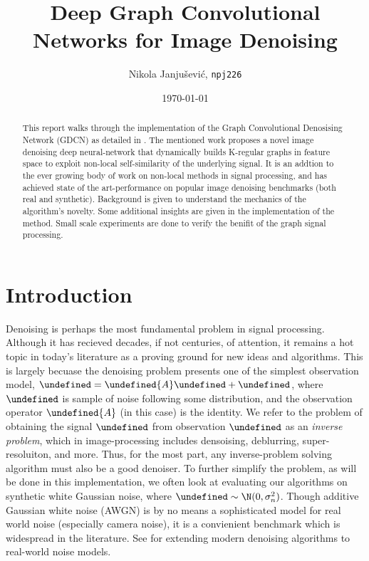 \documentclass[12pt,a4paper,reqno]{amsart}
\title{Deep Graph Convolutional Networks for Image Denoising}
\author{Nikola Janju\v{s}evi\'{c}, \texttt{npj226}}
\date{\today}
\let\bm\undefined
\newcommand{\bm}[1]{\mathbf{#1}}
\let\x\undefined
\newcommand{\x}{\bm{x}}
\let\y\undefined
\newcommand{\y}{\bm{y}}
\let\n\undefined
\newcommand{\n}{\bm{n}}
\begin{document}
\begin{abstract}
This report walks through the implementation of the Graph Convolutional
Denosising Network (GDCN) as detailed in \cite{ValsesiaICIP19}. The mentioned
work proposes a novel image denoising deep neural-network that dynamically
builds K-regular graphs in feature space to exploit non-local self-similarity of
the underlying signal. It is an addtion to the ever growing body of work on
non-local methods in signal processing, and has achieved state of the
art-performance on popular image denoising benchmarks (both real and synthetic). 
Background is given to understand the mechanics of the algorithm's novelty.
Some additional insights are given in the implementation of the method.
Small scale experiments are done to verify the benifit of the graph signal
processing. 
\end{abstract}

\maketitle

\section{Introduction}
Denoising is perhaps the most fundamental problem in signal processing. Although
it has recieved decades, if not centuries, of attention, it remains a hot
topic in today's literature as a proving ground for new ideas and algorithms.
This is largely becuase the denoising problem presents one of the simplest
observation model, $\y = \bm{A}\x + \n$, where $\n$ is sample of noise following
some distribution, and the observation operator $\bm{A}$ (in this case) is the
identity. We refer to the problem of obtaining the signal $\x$ from observation
$\y$ as an \textit{inverse problem}, which in image-processing includes
densoising, deblurring, super-resoluiton, and more. Thus, for the most part, any
inverse-problem solving algorithm must also be a good denoiser. To further
simplify the problem, as will be done in this implementation, we often look at
evaluating our algorithms on synthetic white Gaussian noise, where $\n \sim
\N(0,\sigma_n^2)$. Though additive Gaussian white noise (AWGN) is by no means a
sophisticated model for real world noise (especially camera noise), it is a
convienient benchmark which is widespread in the literature. See
\cite{real_denoising_refs} for extending modern denoising algorithms to
real-world noise models. \\
\end{document}
